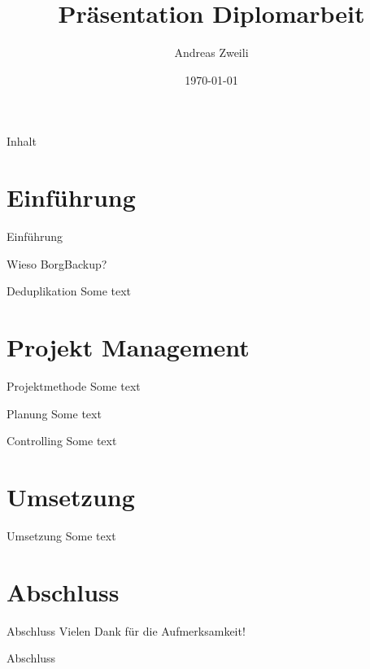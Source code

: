 \documentclass[aspectratio=169]{beamer}
\author{Andreas Zweili}
\date{\today}
\title{Präsentation Diplomarbeit}
\begin{document}
\maketitle\newpage
\begin{frame}{Inhalt}
\tableofcontents
\end{frame}


\section{Einführung}
\label{sec:orgf3c43d1}
\begin{frame}[label={sec:orgb283ed5}]{Einführung}
\begin{block}{Wieso BorgBackup?}
\end{block}
\end{frame}

\begin{frame}[label={sec:org804e06f}]{Deduplikation}
Some text
\end{frame}

\section{Projekt Management}
\label{sec:org7bff5fe}
\begin{frame}[label={sec:org53cc71a}]{Projektmethode}
Some text
\end{frame}

\begin{frame}[label={sec:org84bf141}]{Planung}
Some text
\end{frame}

\begin{frame}[label={sec:org2c02158}]{Controlling}
Some text
\end{frame}

\section{Umsetzung}
\label{sec:org6234572}


\begin{frame}[label={sec:orga1592b0}]{Umsetzung}
Some text
\end{frame}

\section{Abschluss}
\label{sec:org0caf32a}
\begin{frame}[label={sec:orgfa07929}]{Abschluss}
\alert{\huge{Vielen Dank für die Aufmerksamkeit!}}
\end{frame}

\begin{frame}[label={sec:orgdd4c985}]{Abschluss}
\end{frame}
\end{document}
